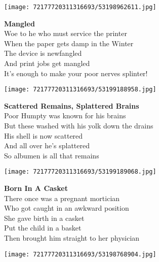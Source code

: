 \documentclass[10pt,letterpaper]{article}
\begin{document}
\begin{center}\texttt{[image: 72177720311316693/53198962611.jpg]}
\end{center}
\begin{center}
\textbf{Mangled}\\
\vskip 0.2in
Woe to he who must service the printer\\
When the paper gets damp in the Winter\\
The device is newfangled\\
And print jobs get mangled\\
It's enough to make your poor nerves splinter!\\
\end{center}
\pagebreak

\begin{center}
\texttt{[image: 72177720311316693/53199188958.jpg]}
\end{center}

\begin{center}
\textbf{Scattered Remains, Splattered Brains}\\
\vskip 0.2in
Poor Humpty was known for his brains\\
But these washed with his yolk down the drains\\
His shell is now scattered\\
And all over he's splattered\\
So albumen is all that remains\\
\end{center}
\pagebreak

\begin{center}\texttt{[image: 72177720311316693/53199189068.jpg]}
\end{center}
\begin{center}
\textbf{Born In A Casket}\\
\vskip 0.2in
There once was a pregnant mortician\\
Who got caught in an awkward position\\
She gave birth in a casket\\
Put the child in a basket\\
Then brought him straight to her physician\\
\end{center}
\pagebreak

\begin{center}
\texttt{[image: 72177720311316693/53198768904.jpg]}
\end{center}
\end{document}
